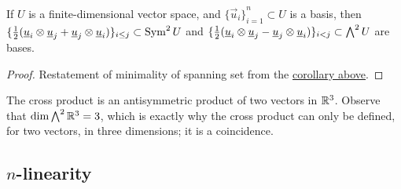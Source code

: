 \begin{corollary}
    If \(U\) is a finite-dimensional vector space,
    and \({\{\vec{u}_i\}}_{i=1}^n \subset U\) is a basis,
    then \(\{\frac{1}{2}(\underline{u}_i\otimes\underline{u}_j+\underline{u}_j\otimes\underline{u}_i)\}_{i \leq j} \subset \operatorname{Sym}^2 U\)
    and \(\{\frac{1}{2}(\underline{u}_i\otimes\underline{u}_j-\underline{u}_j\otimes\underline{u}_i)\}_{i<j} \subset \operatorname{{\bigwedge}}^2 U\)
    are bases.
\end{corollary}
\begin{proof}
    Restatement of minimality of spanning set from the
    \hyperref[cor:dim-sym-wedge]{corollary above}.
\end{proof}
\begin{remark}
    The cross product is an antisymmetric product of two vectors in \(\mathbb{R}^3\).
    Observe that \(\dim \operatorname{{\bigwedge}}^2 \mathbb{R}^3 = 3\),
    which is exactly why the cross product can only be defined,
    for two vectors, in three dimensions;
    it is a coincidence.
\end{remark}

\subsection*{\(n\)-linearity}

